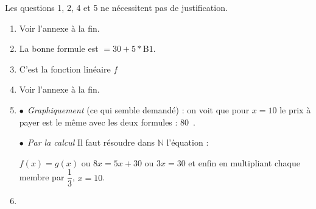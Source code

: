 \documentclass[10pt]{article}
\newcommand{\euro}{\eurologo{}}
\newcommand{\N}{\mathbb{N}}
\begin{document}
Les questions 1, 2, 4 et 5 ne nécessitent pas de justification. 

\medskip

\begin{enumerate}
\item %
Voir l'annexe à la fin.
\item La bonne formule est $=30+5*\text{B}1$.


\item %


C'est la fonction linéaire $f$
\item %
Voir l'annexe à la fin.
\item %
$\bullet~~$\emph{Graphiquement} (ce qui semble demandé) : on voit que pour $x = 10$ le prix à payer est le même avec les deux formules : 80~\euro.

$\bullet~~$\emph{Par la calcul} Il faut résoudre dans $\N$ l'équation : 

$f(x) = g(x)$ ou $8x = 5x + 30$ ou $3x = 30$ et enfin en multipliant chaque membre par $\dfrac{1}{3}$, \: $x = 10$.
\item %


\end{enumerate}
\end{document}
